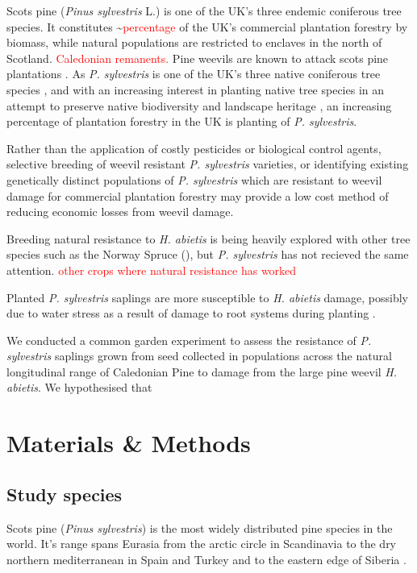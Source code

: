 \documentclass[a4paper, 11pt]{article}
\newcommand{\todo}[1]{\textcolor{red}{#1}}   %
\begin{document}
Scots pine (\textit{Pinus sylvestris} L.) is one of the UK's three endemic coniferous tree species. It constitutes \textasciitilde{}\todo{percentage} of the UK's commercial plantation forestry by biomass, while natural populations are restricted to enclaves in the north of Scotland. \todo{Caledonian remanents.} Pine weevils are known to attack scots pine plantations \citep{}. As \textit{P. sylvestris} is one of the UK's three native coniferous tree species \citep{}, and with an increasing interest in planting native tree species in an attempt to preserve native biodiversity and landscape heritage \citep{}, an increasing percentage of plantation forestry in the UK is planting of \textit{P. sylvestris}.

Rather than the application of costly pesticides or biological control agents, selective breeding of weevil resistant \textit{P. sylvestris} varieties, or identifying existing genetically distinct populations of \textit{P. sylvestris} which are resistant to weevil damage for commercial plantation forestry may provide a low cost method of reducing economic losses from weevil damage.

Breeding natural resistance to \textit{H. abietis} is being heavily explored with other tree species such as the Norway Spruce (\textit{}), but \textit{P. sylvestris} has not recieved the same attention. \todo{other crops where natural resistance has worked}

Planted \textit{P. sylvestris} saplings are more susceptible to \textit{H. abietis} damage, possibly due to water stress as a result of damage to root systems during planting \citep{Selander1990}.

We conducted a common garden experiment to assess the resistance of \textit{P. sylvestris} saplings grown from seed collected in populations across the natural longitudinal range of Caledonian Pine to damage from the large pine weevil \textit{H. abietis}. We hypothesised that 

\section*{Materials \& Methods}

\subsection*{Study species}

Scots pine (\textit{Pinus sylvestris}) is the most widely distributed pine species in the world. It's range spans Eurasia from the arctic circle in Scandinavia to the dry northern mediterranean in Spain and Turkey and to the eastern edge of Siberia \citep{Carlisle1968}. 
\end{document}
